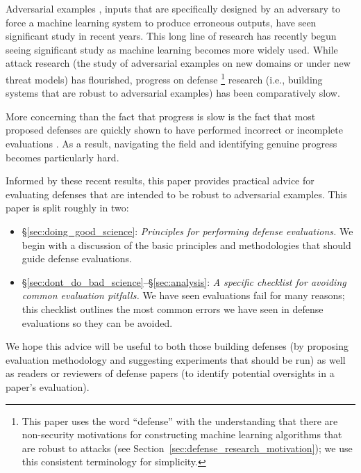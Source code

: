 \documentclass{article} %
\begin{document}
Adversarial examples \citep{szegedy2013intriguing,biggio2013evasion},
inputs that are specifically designed by an
adversary to force a machine learning system to produce erroneous outputs, 
have seen significant study in
recent years.
%
This long line of research
\citep{dalvi2004adversarial,lowd2005adversarial,barreno2006can,barreno2010security,globerson2006nightmare,kolcz2009feature,barreno2010security,biggio2010multiple,vsrndic2013detection}
has recently begun seeing significant study as machine learning
becomes more widely used.
%
While attack research (the study of
adversarial examples on new domains or under new threat
models) has flourished,
progress on defense%
\footnote{This paper uses the word ``defense'' with the
understanding that there are non-security
motivations for constructing machine learning
algorithms that are robust to attacks
(see Section~\ref{sec:defense_research_motivation});
we use this consistent terminology for simplicity.}
research (i.e., building systems that
are robust to adversarial examples) has been comparatively slow.

More concerning than the fact that progress is slow is the fact that
most proposed defenses are quickly shown to have performed
incorrect or incomplete evaluations
\citep{carlini2016defensive,carlini2017towards,brendel2017comment,carlini2017adversarial,he2017adversarial,carlini2017magnet,athalye2018obfuscated,engstrom2018evaluating,athalye2018robustness,uesato2018adversarial,mosbach2018logit,he2018decision,sharma2018bypassing,lu2018limitation,lu2018blimitation,cornelius2019efficacy,carlini2019ami}.
%
As a result, navigating the field and identifying genuine progress becomes particularly hard.

Informed by these recent results, this paper provides practical advice
for evaluating defenses that are intended to be robust to adversarial examples.
%
This paper is split roughly in two:
\begin{itemize}
\item \S\ref{sec:doing_good_science}: \emph{Principles for performing defense evaluations.}
  We begin with a discussion of the basic principles and methodologies that should guide defense evaluations.
\item \S\ref{sec:dont_do_bad_science}--\S\ref{sec:analysis}: \emph{A specific checklist for avoiding common evaluation pitfalls.}
  We have seen evaluations fail for many reasons; this checklist outlines
  the most common errors we have seen in defense evaluations so they can be
  avoided.
\end{itemize}
%
We hope this advice will be useful to both
those building defenses (by proposing evaluation methodology and
suggesting experiments that should be run)
as well as readers or reviewers of defense papers (to identify potential
oversights in a paper's evaluation).
\end{document}
